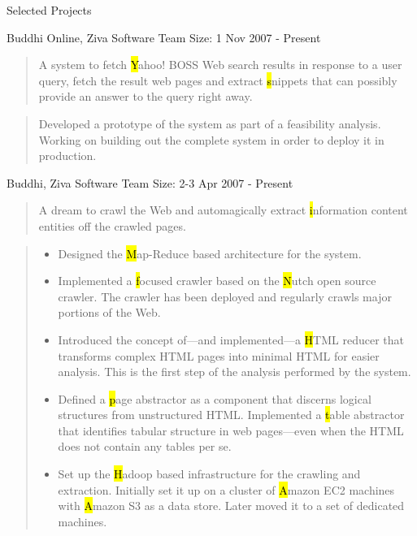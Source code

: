 \documentclass{resume}
\newcommand{\teamsize}{\hfill\sc\footnotesize Team Size: }
\begin{document}
\begin{category}{Selected Projects}{}

    \item {\topic Buddhi Online,} Ziva Software
        {\teamsize 1}
        {\period Nov 2007 - Present}
        \begin{quote}
            A system to fetch {\hl Yahoo! BOSS} Web search results in response
            to a user query, fetch the result web pages and extract {\hl
            snippets} that can possibly provide an answer to the query right
            away.
        \end{quote}
        \begin{quote}
            Developed a prototype of the system as part of a feasibility
            analysis. Working on building out the complete system in order to
            deploy it in production.
        \end{quote}

    \item {\topic Buddhi,} Ziva Software
        {\teamsize 2-3}
        {\period Apr 2007 - Present}
        \begin{quote}
            A dream to crawl the Web and automagically extract {\hl information
            content entities} off the crawled pages.
        \end{quote}
        \begin{quote}
            \begin{itemize}
                \item Designed the {\hl Map-Reduce} based architecture for the
                    system.
                \item Implemented a {\hl focused crawler} based on the {\hl
                    Nutch} open source crawler. The crawler has been deployed
                    and regularly crawls major portions of the Web.
                \item Introduced the concept of---and implemented---a {\hl
                    HTML reducer} that transforms complex HTML pages into
                    minimal HTML for easier analysis. This is the first step of
                    the analysis performed by the system.
                \item Defined a {\hl page abstractor} as a component that
                    discerns logical structures from unstructured HTML.
                    Implemented a {\hl table abstractor} that identifies
                    tabular structure in web pages---even when the HTML does
                    not contain any tables per se.
                \item Set up the {\hl Hadoop} based infrastructure for the
                    crawling and extraction. Initially set it up on a cluster
                    of {\hl Amazon EC2} machines with {\hl Amazon S3} as a data
                    store. Later moved it to a set of dedicated machines.
            \end{itemize}
        \end{quote}


\end{category}
\end{document}
